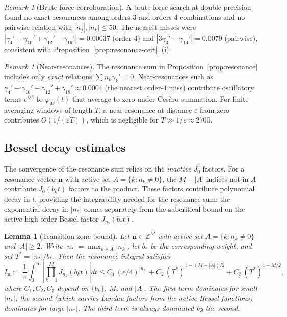 \documentclass[12pt,reqno]{amsart}
\theoremstyle{plain}
\newtheorem{lemma}[theorem]{Lemma}
\theoremstyle{definition}
\theoremstyle{remark}
\newtheorem{remark}[theorem]{Remark}
\newcommand{\Z}{\mathbb{Z}}
\begin{document}
\begin{remark}[Brute-force corroboration]
A brute-force search at double precision found no exact resonances among
orders-3 and orders-4 combinations and no pairwise relation with $|n_j|,|n_k| \leq 50$.
The nearest misses were $|\gamma_4'+\gamma_{10}'+\gamma_{12}'-\gamma_{19}'| = 0.00037$ (order-4) and
$|3\gamma_3' - \gamma_{14}'| = 0.0079$ (pairwise), consistent with
Proposition~\ref{prop:resonance-cert}~(i).
\end{remark}

\begin{remark}[Near-resonances]\label{rem:nearres}
The resonance sum in Proposition~\ref{prop:resonance} includes only \emph{exact} relations $\sum n_k\gamma_k' = 0$.  Near-resonances such as $\gamma_4' - \gamma_{10}' - \gamma_{12}' + \gamma_{19}' \approx 0.0004$ (the nearest order-4 miss) contribute oscillatory terms $e^{i\varepsilon\delta}$ to $\varphi_M(t)$ that average to zero under Ces\`aro summation.  For finite averaging windows of length $T$, a near-resonance at distance $\varepsilon$ from zero contributes $O(1/(\varepsilon T))$, which is negligible for $T \gg 1/\varepsilon \approx 2700$.
\end{remark}


\subsection{Bessel decay estimates}\label{subsec:bessel-decay}

The convergence of the resonance sum relies on the \emph{inactive} $J_0$ factors.  For a resonance vector $\mathbf{n}$ with active set $A = \{k : n_k \neq 0\}$, the $M - |A|$ indices not in $A$ contribute $J_0(b_k t)$ factors to the product.  These factors contribute polynomial decay in $t$, providing the integrability needed for the resonance sum; the exponential decay in $|n_*|$ comes separately from the subcritical bound on the active high-order Bessel factor $J_{n_*}(b_* t)$.

\begin{lemma}[Transition zone bound]\label{lem:Jdecay}
Let $\mathbf{n} \in \Z^M$ with active set $A = \{k : n_k \neq 0\}$ and $|A| \geq 2$.  Write $|n_*| = \max_{k\in A}|n_k|$, let $b_*$ be the corresponding weight, and set $T^* = |n_*|/b_*$.  Then the resonance integral satisfies
\[
  I_{\mathbf{n}} := \frac{1}{\pi}\int_0^\infty \left|\prod_{k=1}^M J_{n_k}(b_k t)\right| dt \leq C_1\, (e/4)^{|n_*|} + C_2\, (T^*)^{1-(M-|A|)/2} + C_3\, (T^*)^{1-M/2},
\]
where $C_1, C_2, C_3$ depend on $\{b_k\}$, $M$, and $|A|$.  The first term dominates for small $|n_*|$; the second (which carries Landau factors from the active Bessel functions) dominates for large $|n_*|$.  The third term is always dominated by the second.
\end{lemma}
\end{document}
